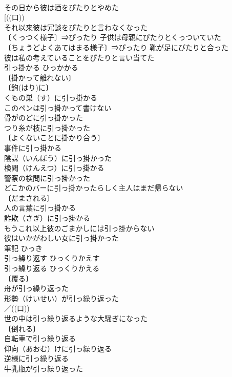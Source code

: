\documentclass[8pt]{extreport}
\begin{document}
\begin{CJK}{UTF8}{min}
\\	その日から彼は酒をぴたりとやめた 
\\	[((口)) 
\\	それ以来彼は冗談をぴたりと言わなくなった 
\\	〔くっつく様子〕⇒ぴったり 子供は母親にぴたりとくっついていた 
\\	〔ちょうどよくあてはまる様子〕⇒ぴったり 靴が足にぴたりと合った 
\\	彼は私の考えていることをぴたりと言い当てた 
\\	引っ掛かる	ひっかかる	
\\	〔掛かって離れない〕
\\	〔鉤(はり)に〕
\\	くもの巣（す）に引っ掛かる 
\\	このペンは引っ掛かって書けない 
\\	骨がのどに引っ掛かった 
\\	つり糸が枝に引っ掛かった 
\\	〔よくないことに掛かり合う〕
\\	事件に引っ掛かる 
\\	陰謀（いんぼう）に引っ掛かった 
\\	検閲（けんえつ）に引っ掛かる 
\\	警察の検問に引っ掛かった 
\\	どこかのバーに引っ掛かったらしく主人はまだ帰らない 
\\	〔だまされる〕
\\	人の言葉に引っ掛かる 
\\	詐欺（さぎ）に引っ掛かる 
\\	もうこれ以上彼のごまかしには引っ掛からない 
\\	彼はいかがわしい女に引っ掛かった 
\\	筆記	ひっき	
\\	引っ繰り返す	ひっくりかえす	
\\	引っ繰り返る	ひっくりかえる	
\\	〔覆る〕
\\	舟が引っ繰り返った 
\\	形勢（けいせい）が引っ繰り返った 
\\	／((口)) 
\\	世の中は引っ繰り返るような大騒ぎになった 
\\	〔倒れる〕
\\	自転車で引っ繰り返る 
\\	仰向（あおむ）けに引っ繰り返る 
\\	逆様に引っ繰り返る 
\\	牛乳瓶が引っ繰り返った 

\end{CJK}
\end{document}
